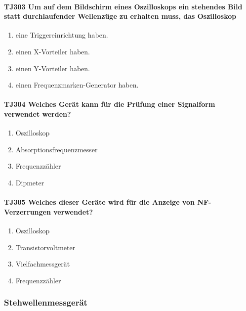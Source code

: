 \documentclass[8pt]{article}
\begin{document}
\paragraph*{TJ303 Um auf dem Bildschirm eines Oszilloskops ein stehendes Bild statt durchlaufender Wellenzüge zu erhalten muss, das Oszilloskop}
\begin{enumerate}[nolistsep,label=\Alph*]
\item eine Triggereinrichtung haben.
\item einen X-Vorteiler haben.
\item einen Y-Vorteiler haben.
\item einen Frequenzmarken-Generator haben.
\end{enumerate}

\paragraph*{TJ304 Welches Gerät kann für die Prüfung einer Signalform verwendet werden?} 
\begin{enumerate}[nolistsep,label=\Alph*]
\item Oszilloskop
\item Absorptionsfrequenzmesser
\item Frequenzzähler
\item Dipmeter
\end{enumerate}

\paragraph*{TJ305 Welches dieser Geräte wird für die Anzeige von NF-Verzerrungen verwendet?}
\begin{enumerate}[nolistsep,label=\Alph*]
\item Oszilloskop
\item Transistorvoltmeter
\item Vielfachmessgerät
\item Frequenzzähler
\end{enumerate}

\pagebreak
\subsubsection{Stehwellenmessgerät}
\end{document}
